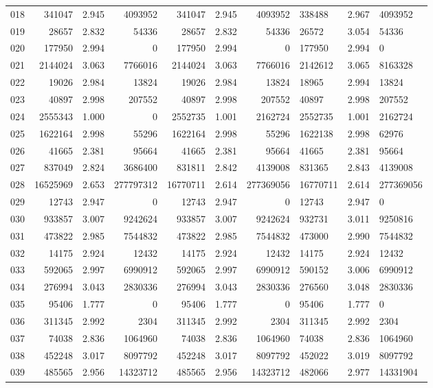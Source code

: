 \begin{longtable}{crrrrrr}
018 & 341047 & 2.945 & 4093952 & 341047 & 2.945 & 4093952 & 338488 & 2.967 & 4093952 \\
019 & 28657 & 2.832 & 54336 & 28657 & 2.832 & 54336 & 26572 & 3.054 & 54336 \\
020 & 177950 & 2.994 & 0 & 177950 & 2.994 & 0 & 177950 & 2.994 & 0 \\
021 & 2144024 & 3.063 & 7766016 & 2144024 & 3.063 & 7766016 & 2142612 & 3.065 & 8163328 \\
022 & 19026 & 2.984 & 13824 & 19026 & 2.984 & 13824 & 18965 & 2.994 & 13824 \\
023 & 40897 & 2.998 & 207552 & 40897 & 2.998 & 207552 & 40897 & 2.998 & 207552 \\
024 & 2555343 & 1.000 & 0 & 2552735 & 1.001 & 2162724 & 2552735 & 1.001 & 2162724 \\
025 & 1622164 & 2.998 & 55296 & 1622164 & 2.998 & 55296 & 1622138 & 2.998 & 62976 \\
026 & 41665 & 2.381 & 95664 & 41665 & 2.381 & 95664 & 41665 & 2.381 & 95664 \\
027 & 837049 & 2.824 & 3686400 & 831811 & 2.842 & 4139008 & 831365 & 2.843 & 4139008 \\
028 & 16525969 & 2.653 & 277797312 & 16770711 & 2.614 & 277369056 & 16770711 & 2.614 & 277369056 \\
029 & 12743 & 2.947 & 0 & 12743 & 2.947 & 0 & 12743 & 2.947 & 0 \\
030 & 933857 & 3.007 & 9242624 & 933857 & 3.007 & 9242624 & 932731 & 3.011 & 9250816 \\
031 & 473822 & 2.985 & 7544832 & 473822 & 2.985 & 7544832 & 473000 & 2.990 & 7544832 \\
032 & 14175 & 2.924 & 12432 & 14175 & 2.924 & 12432 & 14175 & 2.924 & 12432 \\
033 & 592065 & 2.997 & 6990912 & 592065 & 2.997 & 6990912 & 590152 & 3.006 & 6990912 \\
034 & 276994 & 3.043 & 2830336 & 276994 & 3.043 & 2830336 & 276560 & 3.048 & 2830336 \\
035 & 95406 & 1.777 & 0 & 95406 & 1.777 & 0 & 95406 & 1.777 & 0 \\
036 & 311345 & 2.992 & 2304 & 311345 & 2.992 & 2304 & 311345 & 2.992 & 2304 \\
037 & 74038 & 2.836 & 1064960 & 74038 & 2.836 & 1064960 & 74038 & 2.836 & 1064960 \\
038 & 452248 & 3.017 & 8097792 & 452248 & 3.017 & 8097792 & 452022 & 3.019 & 8097792 \\
039 & 485565 & 2.956 & 14323712 & 485565 & 2.956 & 14323712 & 482066 & 2.977 & 14331904 \\

\end{longtable}
